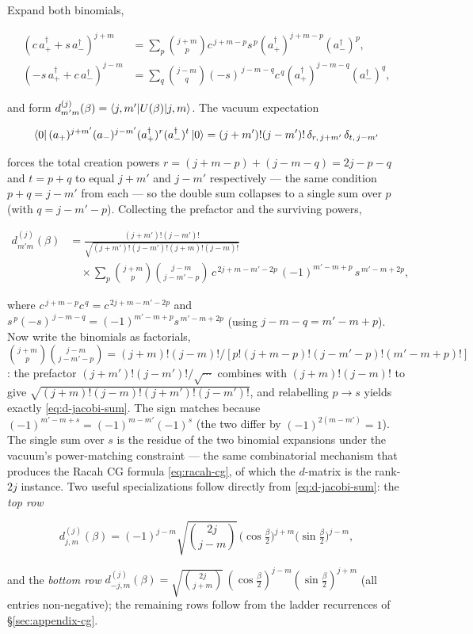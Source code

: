 Expand both binomials,
\begin{linenomath}
\begin{align*}
(c\,a_{+}^{\dagger}+s\,a_{-}^{\dagger})^{j+m}&=\sum_{p}\binom{j+m}{p}c^{\,j+m-p}s^{\,p}(a_{+}^{\dagger})^{j+m-p}(a_{-}^{\dagger})^{p},\\
(-s\,a_{+}^{\dagger}+c\,a_{-}^{\dagger})^{j-m}&=\sum_{q}\binom{j-m}{q}(-s)^{\,j-m-q}c^{\,q}(a_{+}^{\dagger})^{j-m-q}(a_{-}^{\dagger})^{q},
\end{align*}
\end{linenomath}
and form $d^{(j)}_{m'm}(\beta)=\braket{j,m'|U(\beta)|j,m}$. The vacuum expectation
\begin{linenomath}
\begin{equation*}
\bra{0}(a_{+})^{j+m'}(a_{-})^{j-m'}(a_{+}^{\dagger})^{r}(a_{-}^{\dagger})^{t}\ket{0}=(j+m')!(j-m')!\,\delta_{r,\,j+m'}\,\delta_{t,\,j-m'}
\end{equation*}
\end{linenomath}
forces the total creation powers $r=(j+m-p)+(j-m-q)=2j-p-q$ and $t=p+q$ to equal $j+m'$ and $j-m'$ respectively --- the same condition $p+q=j-m'$ from each --- so the double sum collapses to a single sum over $p$ (with $q=j-m'-p$). Collecting the prefactor and the surviving powers,
\begin{linenomath}
\begin{align*}
d^{(j)}_{m'm}(\beta)
&=\frac{(j+m')!(j-m')!}{\sqrt{(j+m')!(j-m')!(j+m)!(j-m)!}}\\
&\quad\times\sum_{p}\binom{j+m}{p}\binom{j-m}{j-m'-p}\,c^{\,2j+m-m'-2p}\,(-1)^{m'-m+p}\,s^{\,m'-m+2p},
\end{align*}
\end{linenomath}
where $c^{\,j+m-p}c^{\,q}=c^{\,2j+m-m'-2p}$ and $s^{\,p}(-s)^{\,j-m-q}=(-1)^{m'-m+p}s^{\,m'-m+2p}$ (using $j-m-q=m'-m+p$). Now write the binomials as factorials, $\binom{j+m}{p}\binom{j-m}{j-m'-p}=(j+m)!(j-m)!/[p!(j+m-p)!(j-m'-p)!(m'-m+p)!]$: the prefactor $(j+m')!(j-m')!/\sqrt{\cdots}$ combines with $(j+m)!(j-m)!$ to give $\sqrt{(j+m)!(j-m)!(j+m')!(j-m')!}$, and relabelling $p\to s$ yields exactly \eqref{eq:d-jacobi-sum}. The sign matches because $(-1)^{m'-m+s}=(-1)^{m-m'}(-1)^{s}$ (the two differ by $(-1)^{2(m-m')}=1$). The single sum over $s$ is the residue of the two binomial expansions under the vacuum's power-matching constraint --- the same combinatorial mechanism that produces the Racah CG formula \eqref{eq:racah-cg}, of which the $d$-matrix is the rank-$2j$ instance. Two useful specializations follow directly from \eqref{eq:d-jacobi-sum}: the \emph{top row}
\begin{linenomath}
\begin{equation}
d^{(j)}_{j,m}(\beta)=(-1)^{j-m}\sqrt{\binom{2j}{j-m}}\,\bigl(\cos\tfrac{\beta}{2}\bigr)^{\!j+m}\!\bigl(\sin\tfrac{\beta}{2}\bigr)^{\!j-m},
\label{eq:d-top-row}
\end{equation}
\end{linenomath}
and the \emph{bottom row} $d^{(j)}_{-j,m}(\beta)=\sqrt{\binom{2j}{j+m}}\,(\cos\frac{\beta}{2})^{j-m}(\sin\frac{\beta}{2})^{j+m}$ (all entries non-negative); the remaining rows follow from the ladder recurrences of \S\ref{sec:appendix-cg}.


